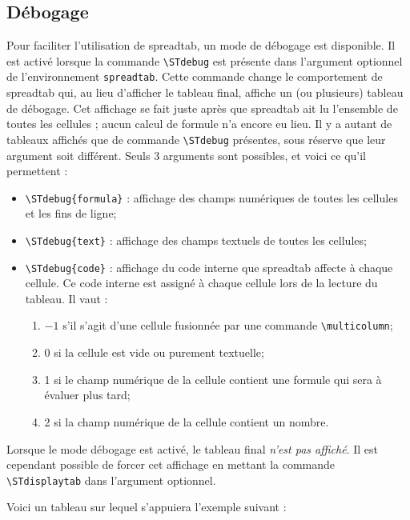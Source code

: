 \documentclass[a4paper,10pt]{article}
\newcommand\verbinline[1][]{\lstinline[breaklines=false,basicstyle=\normalsize\ttfamily,#1]}
\newcommand\ST{\textsf{spreadtab}\xspace}
\begin{document}
\subsection{Débogage}
Pour faciliter l'utilisation de \ST, un mode de débogage est disponible. Il est activé lorsque la commande \verbinline-\STdebug- est présente dans l'argument optionnel de l'environnement \verb-spreadtab-. Cette commande change le comportement de \ST qui, au lieu d'afficher le tableau final, affiche un (ou plusieurs) tableau de débogage. Cet affichage se fait juste après que \ST ait lu l'ensemble de toutes les cellules ; aucun calcul de formule n'a encore eu lieu. Il y a autant de tableaux affichés que de commande \verbinline-\STdebug- présentes, sous réserve que leur argument soit différent. Seuls 3 arguments sont possibles, et voici ce qu'il permettent :
\begin{itemize}
	\item \verbinline-\STdebug{formula}- : affichage des champs numériques de toutes les cellules et les fins de ligne;
	\item \verbinline-\STdebug{text}- : affichage des champs textuels de toutes les cellules;
	\item \verbinline-\STdebug{code}- : affichage du code interne que \ST affecte à chaque cellule. Ce code interne est assigné à chaque cellule lors de la lecture du tableau. Il vaut :
	\begin{enumerate}[label=\small\textbullet]
		\item $-1$ s'il s'agit d'une cellule fusionnée par une commande \verbinline-\multicolumn-;
		\item 0 si la cellule est vide ou purement textuelle;
		\item 1 si le champ numérique de la cellule contient une formule qui sera à évaluer plus tard;
		\item 2 si la champ numérique de la cellule contient un nombre.
	\end{enumerate}
\end{itemize}

Lorsque le mode débogage est activé, le tableau final \emph{n'est pas affiché}. Il est cependant possible de forcer cet affichage en mettant la commande \verbinline-\STdisplaytab- dans l'argument optionnel.

Voici un tableau sur lequel s'appuiera l'exemple suivant :
\end{document}
